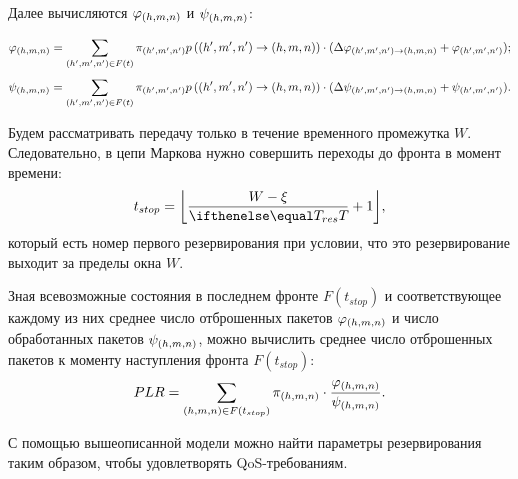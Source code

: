 Далее вычисляются $\varphi_{(h, m, n)}$ и $\psi_{(h, m, n)}$:

\begin{equation*}
\varphi_{(h, m, n)} = \sum\limits_{(h', m', n') \in F(t)} \pi_{(h', m', n')} p\left( (h', m', n') \to (h, m, n) \right) \cdot (\Delta\varphi_{(h', m', n') \to (h, m, n)} + \varphi_{(h', m', n')});
\end{equation*}
\begin{equation*}
\psi_{(h, m, n)} = \sum\limits_{(h', m', n') \in F(t)} \pi_{(h', m', n')} p\left( (h', m', n') \to (h, m, n) \right) \cdot (\Delta\psi_{(h', m', n') \to (h, m, n)} + \psi_{(h', m', n')}).
\end{equation*}

Будем рассматривать передачу только в течение временного промежутка $W$. Следовательно, в цепи Маркова нужно совершить переходы до фронта в момент времени:
$$
t_{stop} = \floor*{\frac{W - \xi}{\Tres} + 1},
$$
который есть номер первого резервирования при условии, что это резервирование выходит за пределы окна $W$.

Зная всевозможные состояния в последнем фронте $F(t_{stop})$ и соответствующее каждому из них среднее число отброшенных пакетов $\varphi_{(h, m, n)}$ и число обработанных пакетов $\psi_{( h, m, n)}$, можно вычислить среднее число отброшенных пакетов к моменту наступления фронта $F(t_{stop})$:
$$
PLR = \sum\limits_{(h,m,n) \in F(t_{stop})} \pi_{(h,m,n)} \cdot \frac{\varphi_{(h, m, n)}}{\psi_{(h, m, n)}}.
$$

С помощью вышеописанной модели можно найти параметры резервирования таким образом, чтобы удовлетворять QoS-требованиям.